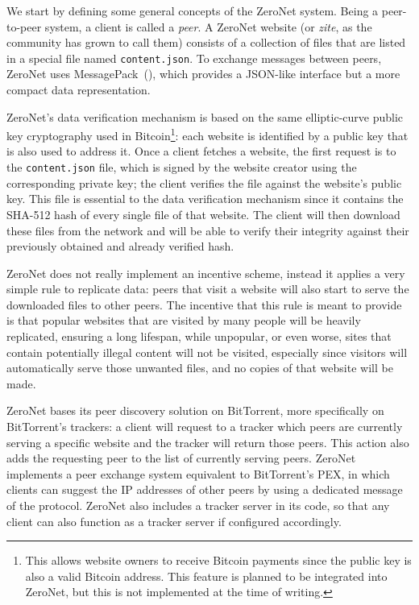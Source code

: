 \documentclass[mscthesis]{usiinfthesis}
\begin{document}
We start by defining some general concepts of the ZeroNet system. Being a peer-to-peer system, a client is called a \emph{peer}. A ZeroNet website (or \emph{zite}, as the community has grown to call them) consists of a collection of files that are listed in a special file named \texttt{content.json}. To exchange messages between peers, ZeroNet uses MessagePack~(\cite{website:msgpack}), which provides a JSON-like interface but a more compact data representation.

ZeroNet's data verification mechanism is based on the same elliptic-curve public key cryptography used in Bitcoin\footnote{This allows website owners to receive Bitcoin payments since the public key is also a valid Bitcoin address. This feature is planned to be integrated into ZeroNet, but this is not implemented at the time of writing.}: each website is identified by a public key that is also used to address it. Once a client fetches a website, the first request is to the \texttt{content.json} file, which is signed by the website creator using the corresponding private key; the client verifies the file against the website's public key. This file is essential to the data verification mechanism since it contains the SHA-512 hash of every single file of that website. The client will then download these files from the network and will be able to verify their integrity against their previously obtained and already verified hash.

ZeroNet does not really implement an incentive scheme, instead it applies a very simple rule to replicate data: peers that visit a website will also start to serve the downloaded files to other peers. The incentive that this rule is meant to provide is that popular websites that are visited by many people will be heavily replicated, ensuring a long lifespan, while unpopular, or even worse, sites that contain potentially illegal content will not be visited, especially since visitors will automatically serve those unwanted files, and no copies of that website will be made.

ZeroNet bases its peer discovery solution on BitTorrent, more specifically on BitTorrent's trackers: a client will request to a tracker which peers are currently serving a specific website and the tracker will return those peers. This action also adds the requesting peer to the list of currently serving peers. ZeroNet implements a peer exchange system equivalent to BitTorrent's PEX, in which clients can suggest the IP addresses of other peers by using a dedicated message of the protocol. ZeroNet also includes a tracker server in its code, so that any client can also function as a tracker server if configured accordingly.
\end{document}
